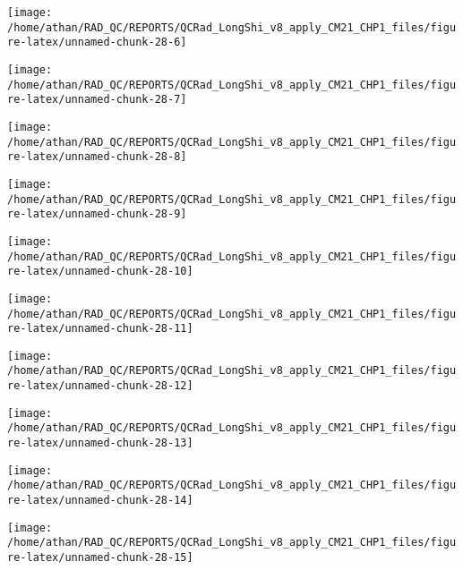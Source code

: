 \documentclass[
  10pt,
  a4paper,oneside]{article}
\begin{document}
\begin{center}\texttt{[image: /home/athan/RAD\_QC/REPORTS/QCRad\_LongShi\_v8\_apply\_CM21\_CHP1\_files/figure-latex/unnamed-chunk-28-6]} \end{center}

\begin{center}\texttt{[image: /home/athan/RAD\_QC/REPORTS/QCRad\_LongShi\_v8\_apply\_CM21\_CHP1\_files/figure-latex/unnamed-chunk-28-7]} \end{center}

\begin{center}\texttt{[image: /home/athan/RAD\_QC/REPORTS/QCRad\_LongShi\_v8\_apply\_CM21\_CHP1\_files/figure-latex/unnamed-chunk-28-8]} \end{center}

\begin{center}\texttt{[image: /home/athan/RAD\_QC/REPORTS/QCRad\_LongShi\_v8\_apply\_CM21\_CHP1\_files/figure-latex/unnamed-chunk-28-9]} \end{center}

\begin{center}\texttt{[image: /home/athan/RAD\_QC/REPORTS/QCRad\_LongShi\_v8\_apply\_CM21\_CHP1\_files/figure-latex/unnamed-chunk-28-10]} \end{center}

\begin{center}\texttt{[image: /home/athan/RAD\_QC/REPORTS/QCRad\_LongShi\_v8\_apply\_CM21\_CHP1\_files/figure-latex/unnamed-chunk-28-11]} \end{center}

\begin{center}\texttt{[image: /home/athan/RAD\_QC/REPORTS/QCRad\_LongShi\_v8\_apply\_CM21\_CHP1\_files/figure-latex/unnamed-chunk-28-12]} \end{center}

\begin{center}\texttt{[image: /home/athan/RAD\_QC/REPORTS/QCRad\_LongShi\_v8\_apply\_CM21\_CHP1\_files/figure-latex/unnamed-chunk-28-13]} \end{center}

\begin{center}\texttt{[image: /home/athan/RAD\_QC/REPORTS/QCRad\_LongShi\_v8\_apply\_CM21\_CHP1\_files/figure-latex/unnamed-chunk-28-14]} \end{center}

\begin{center}\texttt{[image: /home/athan/RAD\_QC/REPORTS/QCRad\_LongShi\_v8\_apply\_CM21\_CHP1\_files/figure-latex/unnamed-chunk-28-15]} \end{center}
\end{document}
